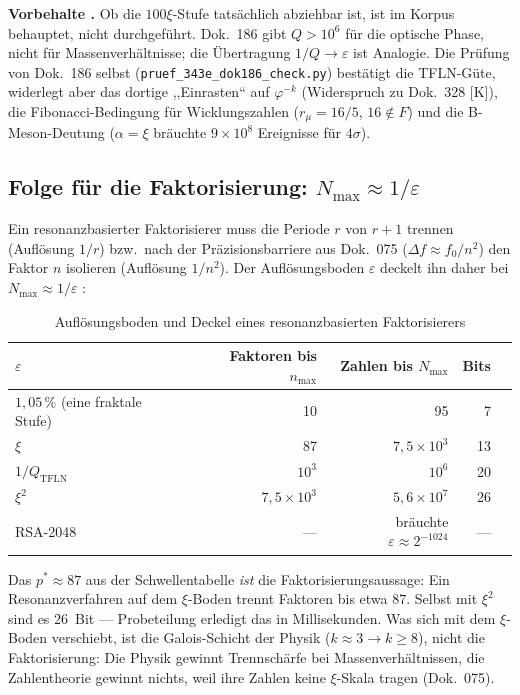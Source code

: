 \textbf{Vorbehalte \SM.} Ob die $100\xi$-Stufe tatsächlich abziehbar ist, ist
im Korpus behauptet, nicht durchgeführt. Dok.~186 gibt $Q>10^6$ für die optische
Phase, nicht für Massenverhältnisse; die Übertragung $1/Q \to \varepsilon$ ist
Analogie. Die Prüfung von Dok.~186 selbst (\texttt{pruef\_343e\_dok186\_check.py})
bestätigt die TFLN-Güte, widerlegt aber das dortige ,,Einrasten`` auf
$\varphi^{-k}$ (Widerspruch zu Dok.~328 [K]), die Fibonacci-Bedingung für
Wicklungszahlen ($r_\mu = 16/5$, $16 \notin F$) und die B-Meson-Deutung
($\alpha=\xi$ bräuchte $9\times10^8$ Ereignisse für $4\sigma$).

\subsection{Folge für die Faktorisierung: $N_\mathrm{max} \approx 1/\varepsilon$}

Ein resonanzbasierter Faktorisierer muss die Periode $r$ von $r{+}1$ trennen
(Auflösung $1/r$) bzw.\ nach der Präzisionsbarriere aus Dok.~075
($\Delta f \approx f_0/n^2$) den Faktor $n$ isolieren (Auflösung $1/n^2$).
Der Auflösungsboden $\varepsilon$ deckelt ihn daher bei $N_\mathrm{max}\approx 1/\varepsilon$ \BM:

\begin{table}[H]
\centering
\caption{Auflösungsboden und Deckel eines resonanzbasierten Faktorisierers}
\begin{tabular}{lrrrr}
\toprule
$\varepsilon$ & Faktoren bis $n_\mathrm{max}$ & Zahlen bis $N_\mathrm{max}$ & Bits \\
\midrule
$1{,}05\,\%$ (eine fraktale Stufe) & 10 & 95 & 7 \\
$\xi$ & 87 & $7{,}5\times10^{3}$ & 13 \\
$1/Q_\mathrm{TFLN}$ & $10^3$ & $10^{6}$ & 20 \\
$\xi^2$ & $7{,}5\times10^3$ & $5{,}6\times10^{7}$ & 26 \\
RSA-2048 & --- & bräuchte $\varepsilon\approx2^{-1024}$ & --- \\
\bottomrule
\end{tabular}
\end{table}

Das $p^*\approx 87$ aus der Schwellentabelle \emph{ist} die Faktorisierungsaussage:
Ein Resonanzverfahren auf dem $\xi$-Boden trennt Faktoren bis etwa $87$. Selbst
mit $\xi^2$ sind es 26~Bit --- Probeteilung erledigt das in Millisekunden.
Was sich mit dem $\xi$-Boden verschiebt, ist die Galois-Schicht der Physik
($k\approx3\to k\geq8$), nicht die Faktorisierung: Die Physik gewinnt
Trennschärfe bei Massenverhältnissen, die Zahlentheorie gewinnt nichts, weil
ihre Zahlen keine $\xi$-Skala tragen (Dok.~075).

